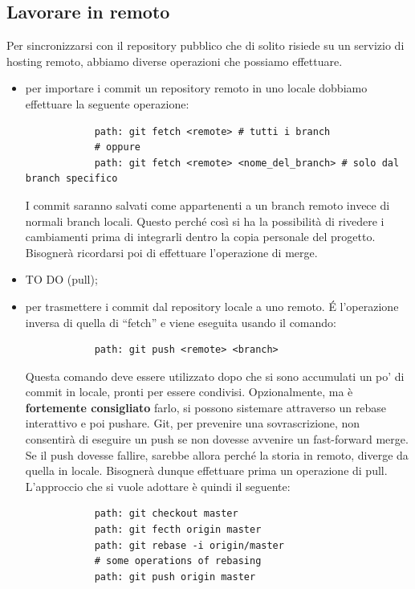 	\subsection{Lavorare in remoto} %
	\label{sub:lavorare_in_remoto}
	Per sincronizzarsi con il repository pubblico che di solito risiede su un servizio di hosting remoto, abbiamo diverse operazioni che possiamo effettuare.
		\begin{itemize}
			\item per importare i commit un repository remoto in uno locale dobbiamo effettuare la seguente operazione:
			\begin{verbatim}
			path: git fetch <remote> # tutti i branch
			# oppure
			path: git fetch <remote> <nome_del_branch> # solo dal branch specifico
			\end{verbatim}
			I commit saranno salvati come appartenenti a un branch remoto invece di normali branch locali. Questo perché così si ha la possibilità di rivedere i cambiamenti prima di integrarli dentro la copia personale del progetto. Bisognerà ricordarsi poi di effettuare l'operazione di merge. \newline
			\item TO DO (pull);



			\item per trasmettere i commit dal repository locale a uno remoto. \'E l'operazione inversa di quella di ``fetch'' e viene eseguita usando il comando:
			\begin{verbatim}
			path: git push <remote> <branch>
			\end{verbatim}
			Questa comando deve essere utilizzato dopo che si sono accumulati un po' di commit in locale, pronti per essere condivisi. Opzionalmente, ma è \textbf{fortemente consigliato} farlo, si possono sistemare attraverso un rebase interattivo e poi pushare. \newline
			Git, per prevenire una sovrascrizione, non consentirà di eseguire un push se non dovesse avvenire un fast-forward merge. Se il push dovesse fallire, sarebbe allora perché la storia in remoto, diverge da quella in locale. Bisognerà dunque effettuare prima un operazione di pull. L'approccio che si vuole adottare è quindi il seguente:
			\begin{verbatim}
			path: git checkout master
			path: git fecth origin master
			path: git rebase -i origin/master
			# some operations of rebasing
			path: git push origin master
			\end{verbatim}
		\end{itemize}

